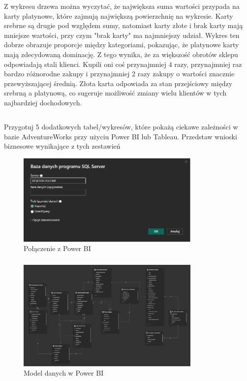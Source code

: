 \documentclass[a4paper,12pt]{article}
\begin{document}
Z wykresu drzewa można wyczytać, że największa suma wartości przypada na karty platynowe, które zajmują największą powierzchnię na wykresie. Karty srebrne są drugie pod względem sumy, natomiast karty złote i brak karty mają mniejsze wartości, przy czym "brak karty" ma najmniejszy udział. Wykres ten dobrze obrazuje proporcje między kategoriami, pokazując, że platynowe karty mają zdecydowaną dominację. Z tego wynika, że za większość obrotów sklepu odpowiadają stali klienci. Kupili oni coś przynajmniej 4 razy, przynajmniej raz bardzo różnorodne zakupy i przynajmniej 2 razy zakupy o wartości znacznie przewyższającej średnią. Złota karta odpowiada za stan przejściowy między srebrną a platynową, co sugeruje możliwość zmiany wielu klientów w tych najbardziej dochodowych.

\subsection{}

Przygotuj 5 dodatkowych tabel/wykresów, które pokażą ciekawe zależności w bazie AdventureWorks przy użyciu Power BI lub Tableau. Przedstaw wnioski biznesowe wynikające z tych zestawień

\begin{figure}[H]
    \centering
    \includegraphics[width=0.8\textwidth]{images/power_bi/connection.png}
    \caption{Połączenie z Power BI}
\end{figure}

\subsubsection{}

\begin{figure}[H]
    \centering
    \includegraphics[width=0.8\textwidth]{images/power_bi/model.png}
    \caption{Model danych w Power BI}
\end{figure}
\end{document}
